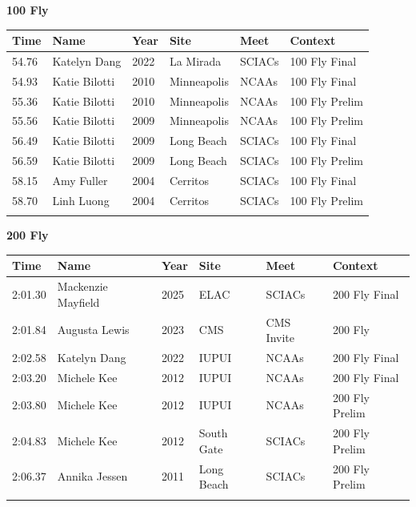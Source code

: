 \noindent\begin{minipage}[t]{0.98\textwidth}
\centering
\textbf{\textcolor{teamprimary}{100 Fly}}\par
\vspace{0.5em}
\centering
\small
\renewcommand{\arraystretch}{1.0}
\setlength{\tabcolsep}{4pt}
\begin{tabular}{@{}p{2.0cm}p{3.2cm}p{1.2cm}p{2.0cm}p{2.0cm}p{2.5cm}@{}}
\toprule
\textbf{Time} & \textbf{Name} & \textbf{Year} & \textbf{Site} & \textbf{Meet} & \textbf{Context} \\
\midrule
54.76 & Katelyn Dang & 2022 & La Mirada & SCIACs & 100 Fly Final \\
54.93 & Katie Bilotti & 2010 & Minneapolis & NCAAs & 100 Fly Final \\
55.36 & Katie Bilotti & 2010 & Minneapolis & NCAAs & 100 Fly Prelim \\
55.56 & Katie Bilotti & 2009 & Minneapolis & NCAAs & 100 Fly Prelim \\
56.49 & Katie Bilotti & 2009 & Long Beach & SCIACs & 100 Fly Final \\
56.59 & Katie Bilotti & 2009 & Long Beach & SCIACs & 100 Fly Prelim \\
58.15 & Amy Fuller & 2004 & Cerritos & SCIACs & 100 Fly Final \\
58.70 & Linh Luong & 2004 & Cerritos & SCIACs & 100 Fly Prelim \\
\bottomrule
\vspace{0.5em}
\end{tabular}
\end{minipage}
\vspace{1.2em}
\noindent\begin{minipage}[t]{0.98\textwidth}
\centering
\textbf{\textcolor{teamprimary}{200 Fly}}\par
\vspace{0.5em}
\centering
\small
\renewcommand{\arraystretch}{1.0}
\setlength{\tabcolsep}{4pt}
\begin{tabular}{@{}p{2.0cm}p{3.2cm}p{1.2cm}p{2.0cm}p{2.0cm}p{2.5cm}@{}}
\toprule
\textbf{Time} & \textbf{Name} & \textbf{Year} & \textbf{Site} & \textbf{Meet} & \textbf{Context} \\
\midrule
2:01.30 & Mackenzie Mayfield & 2025 & ELAC & SCIACs & 200 Fly Final \\
2:01.84 & Augusta Lewis & 2023 & CMS & CMS Invite & 200 Fly \\
2:02.58 & Katelyn Dang & 2022 & IUPUI & NCAAs & 200 Fly Final \\
2:03.20 & Michele Kee & 2012 & IUPUI & NCAAs & 200 Fly Final \\
2:03.80 & Michele Kee & 2012 & IUPUI & NCAAs & 200 Fly Prelim \\
2:04.83 & Michele Kee & 2012 & South Gate & SCIACs & 200 Fly Prelim \\
2:06.37 & Annika Jessen & 2011 & Long Beach & SCIACs & 200 Fly Prelim \\
\bottomrule
\vspace{0.5em}
\end{tabular}
\end{minipage}

